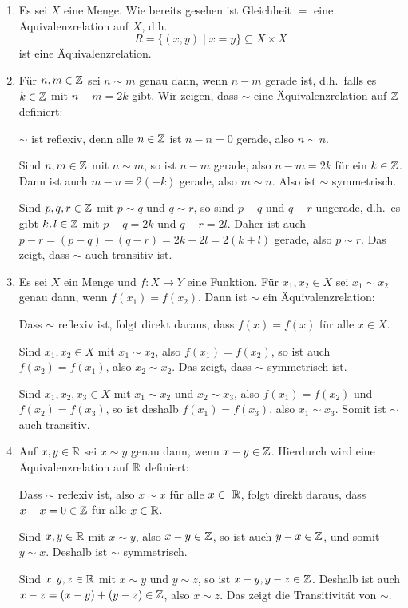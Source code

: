 \begin{bsp}
 \begin{enumerate}[leftmargin=*]
  \item
   Es sei $X$ eine Menge. Wie bereits gesehen ist Gleichheit $=$ eine Äquivalenzrelation auf $X$, d.h.\
   \[
    R = \{(x,y) \mid x = y\} \subseteq X \times X
   \]
   ist eine Äquivalenzrelation.
  \item
   Für $n,m \in \mathbb{Z}$ sei $n \sim m$ genau dann, wenn $n-m$ gerade ist, d.h.\ falls es $k \in \mathbb{Z}$ mit $n-m = 2k$ gibt. Wir zeigen, dass $\sim$ eine Äquivalenzrelation auf $\mathbb{Z}$ definiert:
   
   $\sim$ ist reflexiv, denn alle $n \in \mathbb{Z}$ ist $n-n = 0$ gerade, also $n \sim n$.
   
   Sind $n,m \in \mathbb{Z}$ mit $n \sim m$, so ist $n-m$ gerade, also $n-m = 2k$ für ein $k \in \mathbb{Z}$. Dann ist auch $m-n = 2(-k)$ gerade, also $m \sim n$. Also ist $\sim$ symmetrisch.
   
   Sind $p,q,r \in \mathbb{Z}$ mit $p \sim q$ und $q \sim r$, so sind $p-q$ und $q-r$ ungerade, d.h.\ es gibt $k,l \in \mathbb{Z}$ mit $p-q = 2k$ und $q-r = 2l$. Daher ist auch $p-r = (p-q)+(q-r) = 2k + 2l = 2(k+l)$ gerade, also $p \sim r$. Das zeigt, dass $\sim$ auch transitiv ist.
  \item
   Es sei $X$ ein Menge und $f \colon X \to Y$ eine Funktion. Für $x_1, x_2 \in X$ sei $x_1 \sim x_2$ genau dann, wenn $f(x_1) = f(x_2)$. Dann ist $\sim$ ein Äquivalenzrelation:
   
   Dass $\sim$ reflexiv ist, folgt direkt daraus, dass $f(x) = f(x)$ für alle $x \in X$.
   
   Sind $x_1, x_2 \in X$ mit $x_1 \sim x_2$, also $f(x_1) = f(x_2)$, so ist auch $f(x_2) = f(x_1)$, also $x_2 \sim x_2$. Das zeigt, dass $\sim$ symmetrisch ist.
   
   Sind $x_1, x_2, x_3 \in X$ mit $x_1 \sim x_2$ und $x_2 \sim x_3$, also $f(x_1) = f(x_2)$ und $f(x_2) = f(x_3)$, so ist deshalb $f(x_1) = f(x_3)$, also $x_1 \sim x_3$. Somit ist $\sim$ auch transitiv.
  \item
   Auf $x,y \in \mathbb{R}$ sei $x \sim y$ genau dann, wenn $x-y \in \mathbb{Z}$. Hierdurch wird eine Äquivalenzrelation auf $\mathbb{R}$ definiert:
   
   Dass $\sim$ reflexiv ist, also $x \sim x$ für alle $x \in\ \mathbb{R}$, folgt direkt daraus, dass $x-x = 0 \in \mathbb{Z}$ für alle $x \in \mathbb{R}$.
   
   Sind $x,y \in \mathbb{R}$ mit $x \sim y$, also $x-y \in \mathbb{Z}$, so ist auch $y-x \in \mathbb{Z}$, und somit $y \sim x$. Deshalb ist $\sim$ symmetrisch.
   
   Sind $x,y,z \in \mathbb{R}$ mit $x \sim y$ und $y \sim z$, so ist $x-y, y-z \in \mathbb{Z}$. Deshalb ist auch $x-z = (x-y)+(y-z) \in \mathbb{Z}$, also $x \sim z$. Das zeigt die Transitivität von $\sim$.
 \end{enumerate}
\end{bsp}


